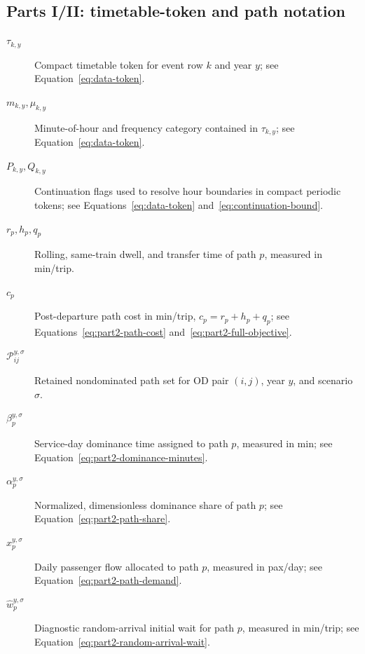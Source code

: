 \documentclass[preprint,12pt]{elsarticle}
\begin{document}
\subsection*{Parts I/II: timetable-token and path notation}
\begin{description}
    \item[$\tau_{k,y}$] Compact timetable token for event row \(k\) and year \(y\); see Equation~\eqref{eq:data-token}.
    \item[$m_{k,y},\mu_{k,y}$] Minute-of-hour and frequency category contained in \(\tau_{k,y}\); see Equation~\eqref{eq:data-token}.
    \item[$P_{k,y},Q_{k,y}$] Continuation flags used to resolve hour boundaries in compact periodic tokens; see Equations~\eqref{eq:data-token} and~\eqref{eq:continuation-bound}.
    \item[$r_p,h_p,q_p$] Rolling, same-train dwell, and transfer time of path \(p\), measured in min/trip.
    \item[$c_p$] Post-departure path cost in min/trip, \(c_p=r_p+h_p+q_p\); see Equations~\eqref{eq:part2-path-cost} and~\eqref{eq:part2-full-objective}.
    \item[$\mathcal{P}_{ij}^{y,\sigma}$] Retained nondominated path set for OD pair \((i,j)\), year \(y\), and scenario \(\sigma\).
    \item[$\beta_p^{y,\sigma}$] Service-day dominance time assigned to path \(p\), measured in min; see Equation~\eqref{eq:part2-dominance-minutes}.
    \item[$\alpha_p^{y,\sigma}$] Normalized, dimensionless dominance share of path \(p\); see Equation~\eqref{eq:part2-path-share}.
    \item[$x_p^{y,\sigma}$] Daily passenger flow allocated to path \(p\), measured in pax/day; see Equation~\eqref{eq:part2-path-demand}.
    \item[$\widehat w_p^{y,\sigma}$] Diagnostic random-arrival initial wait for path \(p\), measured in min/trip; see Equation~\eqref{eq:part2-random-arrival-wait}.
\end{description}
\newpage
\end{document}
